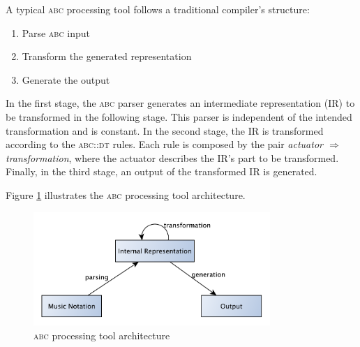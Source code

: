 \documentclass[a4paper,UKenglish]{oasics}
\newcommand{\abc}{\textsc{abc}}
\newcommand{\abcpt}{\abc{} processing tool}
\newcommand{\abcdt}{\textsc{abc::dt}}
\newcommand{\awk}{\texttt{awk} }
\begin{document}

A typical \abcpt{} follows a traditional compiler's structure:

\begin{enumerate}
  \item Parse \abc{} input
  \item Transform the generated representation
  \item Generate the output
\end{enumerate}

In the first stage, the \abc{} parser generates an intermediate representation (IR) to be
transformed in the following stage. This parser is independent of the intended transformation and is
constant. In the second stage, the IR is transformed according to the \abcdt{} rules. Each rule is
composed by the pair \emph{actuator $\Rightarrow$ transformation}, where the actuator describes the
IR's part to be transformed. Finally, in the third stage, an output of the transformed IR is
generated.

Figure \ref{fig:process_stages} illustrates the \abcpt{} architecture.

\begin{figure}[htb]
  \centering 
  \includegraphics[width=0.8\textwidth]{img/abc_dt.pdf} 
  \caption{\abcpt{} architecture}
  \label{fig:process_stages}
\end{figure}
\end{document}
